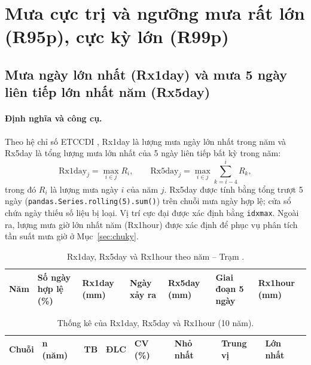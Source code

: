 \section{Mưa cực trị và ngưỡng mưa rất lớn (R95p), cực kỳ lớn (R99p)}

\subsection{Mưa ngày lớn nhất (Rx1day) và mưa 5 ngày liên tiếp lớn nhất năm (Rx5day)}

\paragraph{Định nghĩa và công cụ.} Theo hệ chỉ số ETCCDI \cite{zhang2011, climdex}, Rx1day là lượng mưa ngày lớn nhất trong năm và Rx5day là tổng lượng mưa lớn nhất của 5 ngày liên tiếp bất kỳ trong năm:
\begin{equation}
  \text{Rx1day}_j = \max_{i \in j} R_i, \qquad
  \text{Rx5day}_j = \max_{i \in j} \sum_{k=i-4}^{i} R_k ,
\end{equation}
trong đó $R_i$ là lượng mưa ngày $i$ của năm $j$. Rx5day được tính bằng tổng trượt 5 ngày (\texttt{pandas.Series.rolling(5).sum()}) trên chuỗi mưa ngày hợp lệ; cửa sổ chứa ngày thiếu số liệu bị loại. Vị trí cực đại được xác định bằng \texttt{idxmax}. Ngoài ra, lượng mưa giờ lớn nhất năm (Rx1hour) được xác định để phục vụ phân tích tần suất mưa giờ ở Mục~\ref{sec:chuky}.

\begin{table}[H]
  \centering
  \caption{Rx1day, Rx5day và Rx1hour theo năm -- Trạm \TenTram.}
  \label{tab:rx}
  \footnotesize
  \begin{tabularx}{\linewidth}{|c|Y|Y|Y|Y|Y|Y|}
    \hline
    \textbf{Năm} & \textbf{Số ngày hợp lệ (\%)} & \textbf{Rx1day (mm)} & \textbf{Ngày xảy ra} & \textbf{Rx5day (mm)} & \textbf{Giai đoạn 5 ngày} & \textbf{Rx1hour (mm)} \\
    \hline
    
  \end{tabularx}
\end{table}

\begin{table}[H]
  \centering
  \caption{Thống kê của Rx1day, Rx5day và Rx1hour (10 năm).}
  \label{tab:rx-thongke}
  \footnotesize
  \begin{tabularx}{\linewidth}{|l|Y|Y|Y|Y|Y|Y|Y|}
    \hline
    \textbf{Chuỗi} & \textbf{n (năm)} & \textbf{TB} & \textbf{ĐLC} & \textbf{CV (\%)} & \textbf{Nhỏ nhất} & \textbf{Trung vị} & \textbf{Lớn nhất} \\
    \hline
    
  \end{tabularx}
\end{table}

